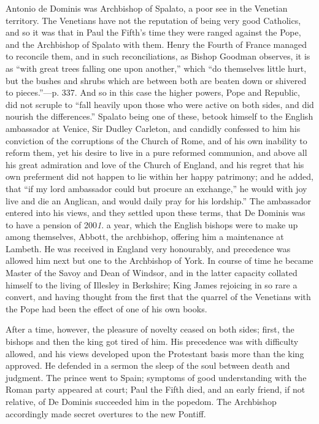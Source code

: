 Antonio de Dominis was Archbishop of Spalato, a
poor see in the Venetian territory. The Venetians have not the
reputation of being very good Catholics, and so it was that in Paul the
Fifth's time they were ranged against the Pope, and the Archbishop of
Spalato with them. Henry the Fourth of France managed to reconcile them,
and in such reconciliations, as Bishop Goodman observes, it is as ``with
great trees falling one upon another,'' which ``do themselves little hurt,
but the bushes and shrubs which are between both are beaten down or
shivered to pieces.''—p. 337. And so in this case the higher powers,
Pope and Republic, did not scruple to ``fall heavily upon those who were
active on both sides, and did nourish the differences.'' Spalato being
one of these, betook himself to the English ambassador at Venice, Sir
Dudley Carleton, and candidly confessed to him his conviction of the
corruptions of the Church of Rome, and of his own inability to reform
them, yet his desire to live in a pure reformed communion, and above all
his great admiration and love of the Church of England, and his regret
that his own preferment did not happen to lie within her happy
patrimony; and he added, that ``if my lord ambassador could but procure
an exchange,'' he would with joy live and die an Anglican, and would
daily pray for his lordship.'' The ambassador entered into his views, and
they settled upon these terms, that De Dominis was to have a pension of
200\emph{1}. a year, which the English bishops were to make up among
themselves, Abbott, the archbishop, offering him a maintenance at
Lambeth. He was received in England very honourably, and precedence was
allowed him next but one to the Archbishop of York. In course of
time he became Master of the Savoy and Dean of Windsor, and in the
latter capacity collated himself to the living of Illesley in Berkshire;
King James rejoicing in so rare a convert, and having thought from the
first that the quarrel of the Venetians with the Pope had been the
effect of one of his own books.

After a time, however, the pleasure of novelty
ceased on both sides; first, the bishops and then the king got tired of
him. His precedence was with difficulty allowed, and his views developed
upon the Protestant basis more than the king approved. He defended in a
sermon the sleep of the soul between death and judgment. The prince went
to Spain; symptoms of good understanding with the Roman party appeared
at court; Paul the Fifth died, and an early friend, if not relative, of
De Dominis succeeded him in the popedom. The Archbishop accordingly made
secret overtures to the new Pontiff.


